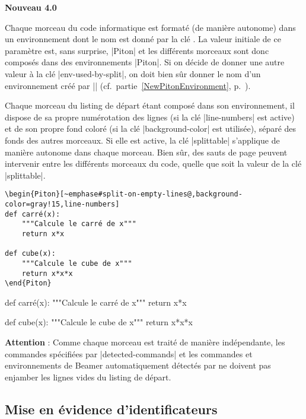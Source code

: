 \documentclass[dvipsnames,svgnames]{article}
\begin{document}
\colorbox{yellow!50}{\textbf{Nouveau 4.0}}\par\nobreak

Chaque morceau du code informatique est formaté (de manière autonome) dans un
environnement dont le nom est donné par la clé . La valeur
initiale de ce paramètre est, sans surprise, |Piton| et les différents morceaux sont donc
composés dans des environnements |{Piton}|. Si on décide de donner une autre valeur à la
clé |env-used-by-split|, on doit bien sûr donner le nom d'un environnement créé par
|\NewPitonEnvironment| (cf.~partie~\ref{NewPitonEnvironment},
p.~\pageref{NewPitonEnvironment}).

\smallskip
Chaque morceau du listing de départ étant composé dans son environnement, il dispose de sa
propre numérotation des lignes (si la clé |line-numbers| est active) et de son propre fond
coloré (si la clé |background-color| est utilisée), séparé des fonds des autres morceaux.
Si elle est active, la clé |splittable| s'applique de manière autonome dans chaque
morceau. Bien sûr, des sauts de page peuvent intervenir entre les différents morceaux du
code, quelle que soit la valeur de la clé |splittable|.

\bigskip
\begin{Verbatim}
\begin{Piton}[~emphase#split-on-empty-lines@,background-color=gray!15,line-numbers]
def carré(x):
    """Calcule le carré de x"""
    return x*x

def cube(x):
    """Calcule le cube de x"""
    return x*x*x
\end{Piton}
\end{Verbatim}


\begin{Piton}[split-on-empty-lines,background-color=gray!15,line-numbers]
def carré(x):
    """Calcule le carré de x"""
    return x*x

def cube(x):
    """Calcule le cube de x"""
    return x*x*x
\end{Piton}


\bigskip
\textbf{Attention} : Comme chaque morceau est traité de manière indépendante, les
commandes spécifiées par |detected-commands| et les commandes et environnements de Beamer
automatiquement détectés par  ne doivent pas enjamber les lignes vides du
listing de départ. 


\bigskip
\subsection{Mise en évidence d'identificateurs}
\end{document}
